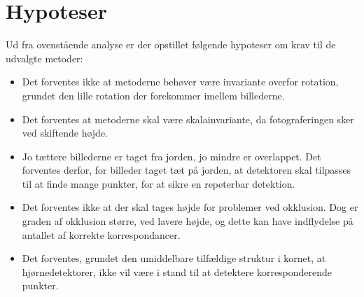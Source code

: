 \section{Hypoteser}
Ud fra ovenstående analyse er der opstillet følgende hypoteser om krav til de udvalgte metoder:
\begin{itemize}
\item{Det forventes ikke at metoderne behøver være invariante overfor rotation, grundet den lille rotation der forekommer imellem billederne.}
\item{Det forventes at metoderne skal være skalainvariante, da fotograferingen sker ved skiftende højde.}
\item{Jo tættere billederne er taget fra jorden, jo mindre er overlappet. Det forventes derfor, for billeder taget tæt på jorden, at detektoren skal tilpasses til at finde mange punkter, for at sikre en repeterbar detektion.}
\item{Det forventes ikke at der skal tages højde for problemer ved okklusion. Dog er graden af okklusion større, ved lavere højde, og dette kan have indflydelse på antallet af korrekte korrespondancer.
}
\item{Det forventes, grundet den umiddelbare tilfældige struktur i kornet, at hjørnedetektorer, ikke vil være i stand til at detektere korresponderende punkter.}
\end{itemize}